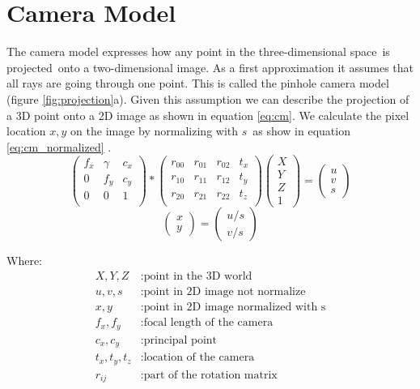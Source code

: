 \documentclass[11pt,a4paper,titlepage,oneside]{report}
\begin{document}
\section{Camera Model}

The camera model expresses how any point in the three-dimensional space is projected onto a two-dimensional image. As a first approximation it assumes that all rays are going through one point. This is called the pinhole camera model (figure \ref{fig:projection}a). Given this assumption we can describe the projection of a 3D point onto a 2D image as shown in equation \ref{eq:cm}. We calculate the pixel location $x,y$ on the image by normalizing with $s$ as show in equation \ref{eq:cm_normalized} \cite{rvc}.
\begin{equation}\label{eq:cm}
  \begin{pmatrix}
		f_x & \gamma & c_x \\
		0 & f_y & c_y \\
		0 & 0 & 1 \\
	\end{pmatrix}*
	\begin{pmatrix}
		r_{00} & r_{01} & r_{02} & t_x \\
		r_{10} & r_{11} & r_{12} & t_y \\
		r_{20} & r_{21} & r_{22} & t_z \\
	\end{pmatrix}
	\begin{pmatrix}
		X \\
		Y \\
		Z \\
		1
	\end{pmatrix}=
	\begin{pmatrix}
		u \\
		v \\
		s
  \end{pmatrix}
\end{equation}
\begin{equation}\label{eq:cm_normalized}
	\begin{pmatrix}
		x \\
		y
	\end{pmatrix}=
	\begin{pmatrix}
		u/s \\
		v/s 
  \end{pmatrix}
\end{equation}

Where:
\begin{align*}
  X,Y,Z			&: \text{point in the 3D world}\\
	u,v,s	   	&: \text{point in 2D image not normalize}\\
	x,y				&: \text{point in 2D image normalized with s}\\
	f_x,f_y  	&: \text{focal length of the camera}\\
  c_x,c_y  	&: \text{principal point}\\
  t_x,t_y,t_z	&: \text{location of the camera}\\
  r_{ij}	&: \text{part of the rotation matrix}
\end{align*}
\end{document}
